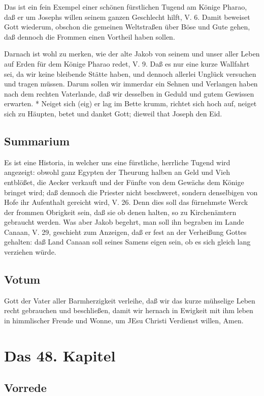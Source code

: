 Das ist ein fein Exempel einer schönen fürstlichen Tugend am Könige Pharao, daß er um Josephs willen seinem ganzen Geschlecht hilft, V. 6. Damit beweiset Gott wiederum, obschon die gemeinen Weltstraßen über Böse und Gute gehen, daß dennoch die Frommen einen Vortheil haben sollen.

Darnach ist wohl zu merken, wie der alte Jakob von seinem und unser aller Leben auf Erden für dem Könige Pharao redet, V. 9. Daß es nur eine kurze Wallfahrt sei, da wir keine bleibende Stätte haben, und dennoch allerlei Unglück versuchen und tragen müssen. Darum sollen wir immerdar ein Sehnen und Verlangen haben nach dem rechten Vaterlande, daß wir desselben in Geduld und gutem Gewissen erwarten.
* Neiget sich (eig) er lag im Bette krumm, richtet sich hoch auf, neiget sich zu Häupten, betet und danket Gott; dieweil that Joseph den Eid.

\section{Summarium}

Es ist eine Historia, in welcher uns eine fürstliche, herrliche Tugend wird angezeigt: obwohl ganz Egypten der Theurung halben an Geld und Vieh entblößet, die Aecker verkauft und der Fünfte von dem Gewächs dem Könige bringet wird; daß dennoch die Priester nicht beschweret, sondern denselbigen von Hofe ihr Aufenthalt gereicht wird, V. 26. Denn dies soll das fürnehmste Werck der frommen Obrigkeit sein, daß sie ob denen halten, so zu Kirchenämtern gebraucht werden. Was aber Jakob begehrt, man soll ihn begraben im Lande Canaan, V. 29, geschieht zum Anzeigen, daß er fest an der Verheißung Gottes gehalten: daß Land Canaan soll seines Samens eigen sein, ob es sich gleich lang verziehen würde.

\section{Votum}

Gott der Vater aller Barmherzigkeit verleihe, daß wir das kurze mühselige Leben recht gebrauchen und beschließen, damit wir hernach in Ewigkeit mit ihm leben in himmlischer Freude und Wonne, um JEsu Christi Verdienst willen, Amen.

\chapter{Das 48. Kapitel}

\section{Vorrede}

